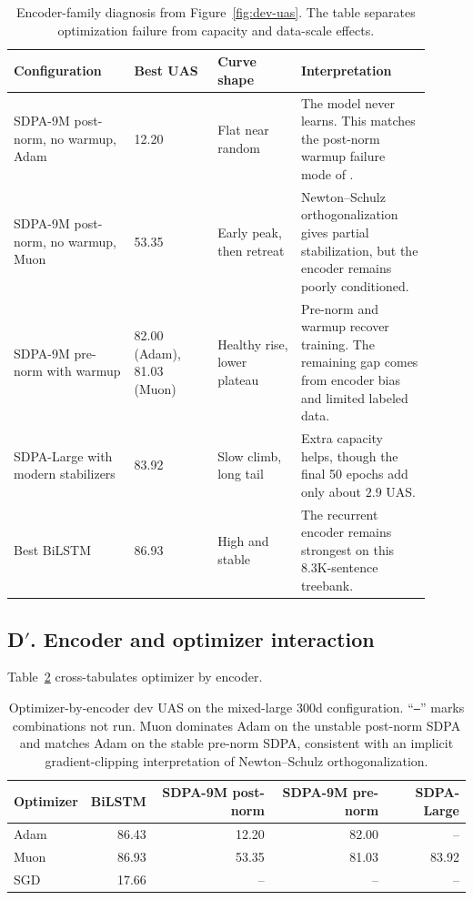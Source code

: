\begin{table}[t]
\caption{Encoder-family diagnosis from Figure~\ref{fig:dev-uas}. The table separates optimization failure from capacity and data-scale effects.}
\label{tab:encoder-diagnosis}
\centering
\small
\begin{tabular}{p{0.26\linewidth}p{0.18\linewidth}p{0.18\linewidth}p{0.29\linewidth}}
\toprule
Configuration & Best UAS & Curve shape & Interpretation \\
\midrule
SDPA-9M post-norm, no warmup, Adam & 12.20 & Flat near random & The model never learns. This matches the post-norm warmup failure mode of \citet{xiong2020lnorder}. \\
SDPA-9M post-norm, no warmup, Muon & 53.35 & Early peak, then retreat & Newton--Schulz orthogonalization gives partial stabilization, but the encoder remains poorly conditioned. \\
SDPA-9M pre-norm with warmup & 82.00 (Adam), 81.03 (Muon) & Healthy rise, lower plateau & Pre-norm and warmup recover training. The remaining gap comes from encoder bias and limited labeled data. \\
SDPA-Large with modern stabilizers & 83.92 & Slow climb, long tail & Extra capacity helps, though the final 50 epochs add only about $2.9$ UAS. \\
Best BiLSTM & 86.93 & High and stable & The recurrent encoder remains strongest on this 8.3K-sentence treebank. \\
\bottomrule
\end{tabular}
\end{table}

\subsection{D$'$. Encoder and optimizer interaction}
\label{sec:exp-encoder-discussion}

Table~\ref{tab:encoder-optim-cross} cross-tabulates optimizer by encoder.

\begin{table}[t]
\caption{Optimizer-by-encoder dev UAS on the mixed-large 300d configuration. ``\texttt{--}'' marks combinations not run. Muon dominates Adam on the unstable post-norm SDPA and matches Adam on the stable pre-norm SDPA, consistent with an implicit gradient-clipping interpretation of Newton--Schulz orthogonalization.}
\label{tab:encoder-optim-cross}
\centering
\small
\begin{tabular}{lrrrr}
\toprule
Optimizer & BiLSTM & SDPA-9M post-norm & SDPA-9M pre-norm & SDPA-Large \\
\midrule
Adam   & 86.43 & 12.20 & 82.00 & --     \\
Muon   & 86.93 & 53.35 & 81.03 & 83.92  \\
SGD    & 17.66 & --    & --    & --     \\
\bottomrule
\end{tabular}
\end{table}

